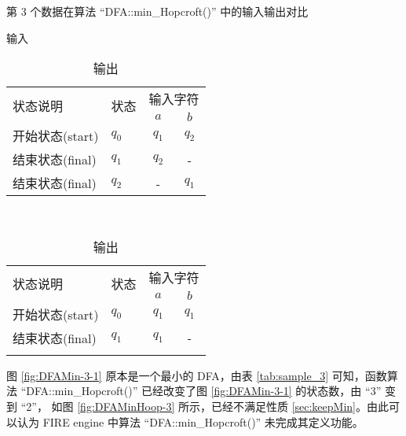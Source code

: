 \begin{table}[!htbp]
    \caption{第 3 个数据在算法 “DFA::min\_Hopcroft()” 中的输入输出对比 }
    \label{tab:sample_3}
    \centering
    \small%
    \setlength{\tabcolsep}{4pt}%
    \renewcommand{\arraystretch}{1.2}%
    \begin{subtable}[t]{0.45\textwidth}
        \centering
        \caption{输入}
        \label{tab:sample_3_origin}
        \begin{tabular}{l p{2em}<{\centering} c c}
            \toprule%
            \multirow{2}{*}{状态说明} & \multirow{2}{*}{状态} & \multicolumn{2}{c}{输入字符} \\
            \cline{3-4}      &    &$a$ & $b$  \\
            \midrule%
            开始状态(start)  & $q_0$ & $q_1$   & $q_2$   \\
            结束状态(final) & $q_1$ & $q_2$   &     -   \\
            结束状态(final) & $q_2$ & -       & $q_1$   \\
            \bottomrule%
        \end{tabular}
    \end{subtable}
    ~%
    \begin{subtable}[t]{0.45\textwidth}
        \centering
        \caption{输出}
        \label{tab:sample_3_result}
        \begin{tabular}{l p{2em}<{\centering} c c }
            \toprule%
            \multirow{2}{*}{状态说明} & \multirow{2}{*}{状态} & \multicolumn{2}{c}{输入字符} \\
            \cline{3-4}      &    & $a$ & $b$  \\
            \midrule%
            开始状态(start)  & $q_0$ & $q_1$   & $q_1$   \\
            结束状态(final) & $q_1$ & $q_1$   & -   \\
            & & & \\
            \bottomrule%
        \end{tabular}
    \end{subtable}
\end{table}

图 \ref{fig:DFAMin-3-1} 原本是一个最小的 DFA，由表 \ref{tab:sample_3} 可知，函数算法 “DFA::min\_Hopcroft()” 已经改变了图 \ref{fig:DFAMin-3-1} 的状态数，由 “3” 变到 “2”， 如图 \ref{fig:DFAMinHoop-3} 所示，已经不满足性质 \ref{sec:keepMin}。由此可以认为 FIRE engine 中算法 “DFA::min\_Hopcroft()” 未完成其定义功能。

